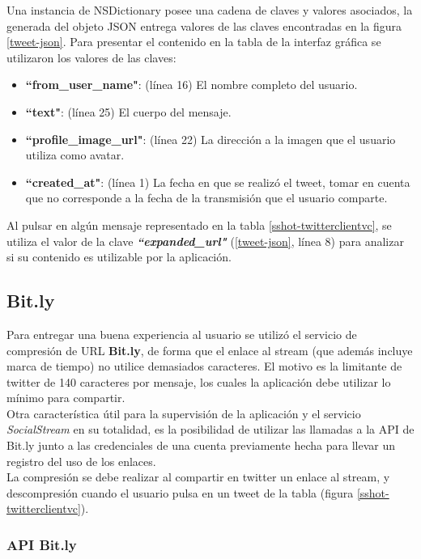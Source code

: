 Una instancia de NSDictionary posee una cadena de claves y valores asociados, la generada del objeto JSON entrega valores de las claves encontradas en la figura \ref{tweet-json}.
Para presentar el contenido en la tabla de la interfaz gráfica se utilizaron los valores de las claves:
\begin{itemize}
\item \textbf{\textquotedblleft from\_user\_name"}: (línea 16) El nombre completo del usuario.
\item \textbf{\textquotedblleft text"}: (línea 25) El cuerpo del mensaje.
\item \textbf{\textquotedblleft profile\_image\_url"}: (línea 22) La dirección a la imagen que el usuario utiliza como avatar.
\item \textbf{\textquotedblleft created\_at"}: (línea 1) La fecha en que se realizó el tweet, tomar en cuenta que no corresponde a la fecha de la transmisión que el usuario comparte. 
\end{itemize}
Al pulsar en algún mensaje representado en la tabla \ref{sshot-twitterclientvc}, se utiliza el valor de la clave \textit{\textbf{\textquotedblleft expanded\_url"}} (\ref{tweet-json}, línea 8) para analizar si su contenido es utilizable por la aplicación.

	\subsection{Bit.ly}
Para entregar una buena experiencia al usuario se utilizó el servicio de compresión de URL \textbf{Bit.ly}, de forma que el enlace al stream (que además incluye marca de tiempo) no utilice demasiados caracteres. El motivo es la limitante de twitter de 140 caracteres por mensaje, los cuales la aplicación debe utilizar lo mínimo para compartir.\\

Otra característica útil para la supervisión de la aplicación y el servicio \textit{SocialStream} en su totalidad, es la posibilidad de utilizar las llamadas a la API de Bit.ly junto a las credenciales de una cuenta previamente hecha para llevar un registro del uso de los enlaces. \\

La compresión se debe realizar al compartir en twitter un enlace al stream, y descompresión cuando el usuario pulsa en un tweet de la tabla (figura \ref{sshot-twitterclientvc}).

		\subsubsection{API Bit.ly}

